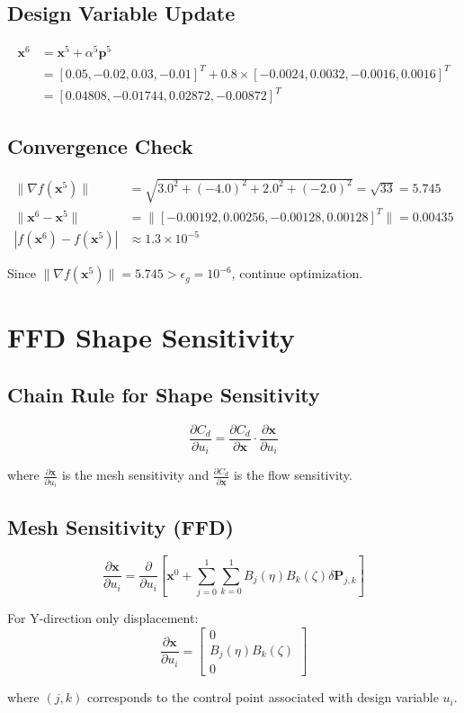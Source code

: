 \documentclass{article}
\begin{document}
\subsection{Design Variable Update}
\begin{align}
\mathbf{x}^6 &= \mathbf{x}^5 + \alpha^5 \mathbf{p}^5 \\
&= [0.05, -0.02, 0.03, -0.01]^T + 0.8 \times [-0.0024, 0.0032, -0.0016, 0.0016]^T \\
&= [0.04808, -0.01744, 0.02872, -0.00872]^T
\end{align}

\subsection{Convergence Check}
\begin{align}
\|\nabla f(\mathbf{x}^5)\| &= \sqrt{3.0^2 + (-4.0)^2 + 2.0^2 + (-2.0)^2} = \sqrt{33} = 5.745 \\
\|\mathbf{x}^6 - \mathbf{x}^5\| &= \|[-0.00192, 0.00256, -0.00128, 0.00128]^T\| = 0.00435 \\
|f(\mathbf{x}^6) - f(\mathbf{x}^5)| &\approx 1.3 \times 10^{-5}
\end{align}

Since $\|\nabla f(\mathbf{x}^5)\| = 5.745 > \epsilon_g = 10^{-6}$, continue optimization.

\section{FFD Shape Sensitivity}

\subsection{Chain Rule for Shape Sensitivity}
\begin{equation}
\frac{\partial C_d}{\partial u_i} = \frac{\partial C_d}{\partial \mathbf{x}} \cdot \frac{\partial \mathbf{x}}{\partial u_i}
\end{equation}

where $\frac{\partial \mathbf{x}}{\partial u_i}$ is the mesh sensitivity and $\frac{\partial C_d}{\partial \mathbf{x}}$ is the flow sensitivity.

\subsection{Mesh Sensitivity (FFD)}
\begin{equation}
\frac{\partial \mathbf{x}}{\partial u_i} = \frac{\partial}{\partial u_i}\left[\mathbf{x}^0 + \sum_{j=0}^{1} \sum_{k=0}^{1} B_j(\eta) B_k(\zeta) \delta \mathbf{P}_{j,k} \right]
\end{equation}

For Y-direction only displacement:
\begin{equation}
\frac{\partial \mathbf{x}}{\partial u_i} = \begin{bmatrix} 0 \\ B_j(\eta) B_k(\zeta) \\ 0 \end{bmatrix}
\end{equation}

where $(j,k)$ corresponds to the control point associated with design variable $u_i$.
\end{document}
